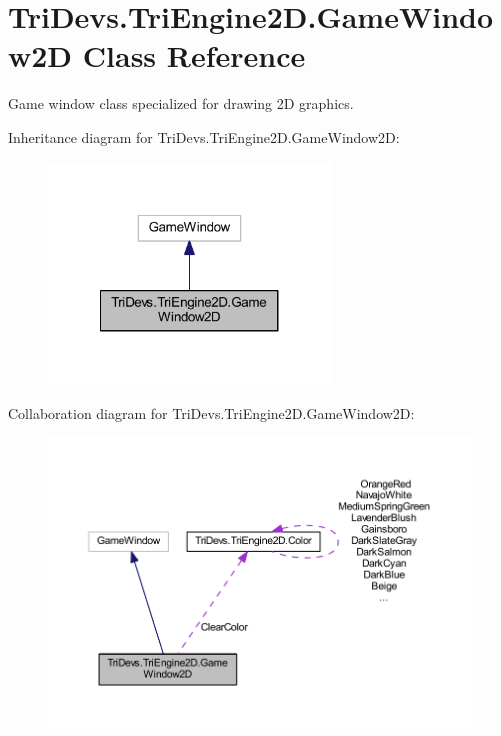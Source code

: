 \hypertarget{class_tri_devs_1_1_tri_engine2_d_1_1_game_window2_d}{\section{Tri\-Devs.\-Tri\-Engine2\-D.\-Game\-Window2\-D Class Reference}
\label{class_tri_devs_1_1_tri_engine2_d_1_1_game_window2_d}
}


Game window class specialized for drawing 2\-D graphics.  




Inheritance diagram for Tri\-Devs.\-Tri\-Engine2\-D.\-Game\-Window2\-D\-:\nopagebreak
\begin{figure}[H]
\begin{center}
\leavevmode
\includegraphics[width=212pt]{class_tri_devs_1_1_tri_engine2_d_1_1_game_window2_d__inherit__graph}
\end{center}
\end{figure}


Collaboration diagram for Tri\-Devs.\-Tri\-Engine2\-D.\-Game\-Window2\-D\-:\nopagebreak
\begin{figure}[H]
\begin{center}
\leavevmode
\includegraphics[width=350pt]{class_tri_devs_1_1_tri_engine2_d_1_1_game_window2_d__coll__graph}
\end{center}
\end{figure}
